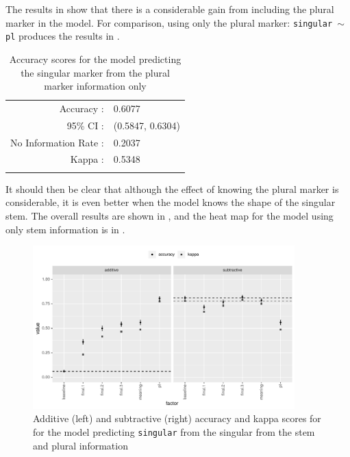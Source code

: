 The results in  show that there is a considerable gain from including the plural marker in the model. For comparison, using only the plural marker: \texttt{singular $\sim$ pl} produces the results in .

\begin{table}
  \centering
  \begin{tabular}{rl}
    \lsptoprule
    \multicolumn{2}{c}{Overall Statistics}   \\
    \midrule
    Accuracy :            & 0.6077           \\
    95\% CI :             & (0.5847, 0.6304) \\
    No Information Rate : & 0.2037           \\
    Kappa :               & 0.5348           \\
    \lspbottomrule
  \end{tabular}
  \caption{Accuracy scores for the model predicting the singular marker from the plural marker information only}\label{tab:sg-marker-pl}
\end{table}

It should then be clear that although the effect of knowing the plural marker is considerable, it is even better when the model knows the shape of the singular stem. The overall results are shown in , and the heat map for the model using only stem information is in .

\begin{figure}
  \centering
  \includegraphics[width=0.9\textwidth]{./figures/kasem/p-fi-sgmark-sg-overall.pdf}
  \caption{Additive (left) and subtractive (right) accuracy and kappa scores for for the model predicting \texttt{singular} from the singular from the stem and plural information}\label{fig:overall-fi-singular-sg}
\end{figure}

